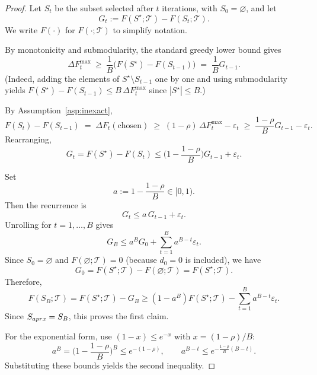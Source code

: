 \documentclass[10pt,a4paper]{amsart}
\begin{document}
\begin{proof}
Let $S_t$ be the subset selected after $t$ iterations, with $S_0=\varnothing$, and let
\[
G_t := F(S^\star;\mathcal T)-F(S_t;\mathcal T).
\]
We write $F(\cdot)$ for $F(\cdot;\mathcal T)$ to simplify notation.

By monotonicity and submodularity, the standard greedy lower bound gives
\[
\Delta F_t^{\max}\ \ge\ \frac{1}{B}\big(F(S^\star)-F(S_{t-1})\big)
\;=\;\frac{1}{B}G_{t-1}.
\]
(Indeed, adding the elements of $S^\star\setminus S_{t-1}$ one by one and using submodularity yields
$F(S^\star)-F(S_{t-1})\le B\,\Delta F_t^{\max}$ since $|S^\star|\le B$.)

By Assumption~\ref{asp:inexact},
\[
F(S_t)-F(S_{t-1})
\;=\;\Delta F_t(\text{chosen})
\;\ge\; (1-\rho)\,\Delta F_t^{\max}-\varepsilon_t
\;\ge\; \frac{1-\rho}{B}G_{t-1}-\varepsilon_t.
\]
Rearranging,
\[
G_t
=F(S^\star)-F(S_t)
\le \Big(1-\frac{1-\rho}{B}\Big)G_{t-1}+\varepsilon_t.
\]

Set
\[
a:=1-\frac{1-\rho}{B}\in[0,1).
\]
Then the recurrence is
\[
G_t\le a\,G_{t-1}+\varepsilon_t.
\]
Unrolling for $t=1,\dots,B$ gives
\[
G_B\le a^B G_0+\sum_{t=1}^B a^{B-t}\varepsilon_t.
\]
Since $S_0=\varnothing$ and $F(\varnothing;\mathcal T)=0$ (because $d_0=0$ is included), we have
\[
G_0=F(S^\star;\mathcal T)-F(\varnothing;\mathcal T)=F(S^\star;\mathcal T).
\]
Therefore,
\[
F(S_B;\mathcal T)
=F(S^\star;\mathcal T)-G_B
\ge (1-a^B)F(S^\star;\mathcal T)-\sum_{t=1}^B a^{B-t}\varepsilon_t.
\]
Since $S_{\rm aprx}=S_B$, this proves the first claim.

For the exponential form, use $(1-x)\le e^{-x}$ with $x=(1-\rho)/B$:
\[
a^B=\Big(1-\frac{1-\rho}{B}\Big)^B\le e^{-(1-\rho)},
\qquad
a^{B-t}\le e^{-\frac{1-\rho}{B}(B-t)}.
\]
Substituting these bounds yields the second inequality.
\end{proof}
\end{document}
